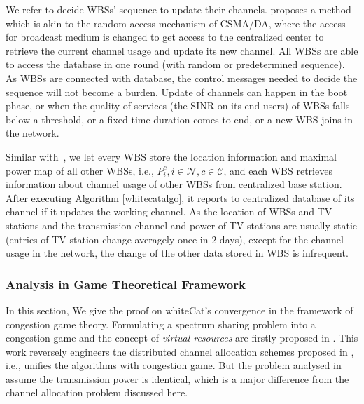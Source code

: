 \documentclass[times]{ettauth}
\newcommand{\ie}{i.e., }
\theoremstyle{mytheoremstyle}
\theoremstyle{mytheoremstyle}
\theoremstyle{mytheoremstyle}
\begin{document}
We refer \cite{CApotentialLearning_05dyspan} to decide WBSs' sequence to update their channels.
\cite{CApotentialLearning_05dyspan} proposes a method which is akin to the random access mechanism of CSMA/DA, where the access for broadcast medium is changed to get access to the centralized center to retrieve the current channel usage and update its new channel. 
All WBSs are able to access the database in one round (with random or predetermined sequence). As WBSs are connected with database, the control messages needed to decide the sequence will not become a burden. 
Update of channels can happen in the boot phase, or when the quality of services (the SINR on its end users) of WBSs falls below a threshold, or a fixed time duration comes to end, or a new WBS joins in the network. 

Similar with~\cite{SenseLess2011}, we let every WBS store the location information and maximal power map of all other WBSs, \ie $P_i^c, i\in\mathcal{N}, c\in\mathcal{C}$, and each WBS retrieves information about channel usage of other WBSs from centralized base station.
After executing Algorithm \ref{whitecatalgo}, it reports to centralized database of its channel if it updates the working channel.
As the location of WBSs and TV stations and the transmission channel and power of TV stations are usually static (entries of TV station change averagely once in 2 days\cite{SenseLess2011}), except for the channel usage in the network, the change of the other data stored in WBS is infrequent. 


\subsubsection{Analysis in Game Theoretical Framework}
\label{game}
In this section, We give the proof on whiteCat's convergence in the framework of congestion game theory.
Formulating a spectrum sharing problem into a congestion game and the concept of \textit{virtual resources} are firstly proposed in \cite{allerton08_liu}.
This work reversely engineers the distributed channel allocation schemes proposed in \cite{babadi_08, Ko_DistributedCA}, \ie unifies the algorithms with congestion game.
But the problem analysed in~\cite{allerton08_liu} assume the transmission power is identical, which is a major difference from the channel allocation problem discussed here. 
\end{document}
